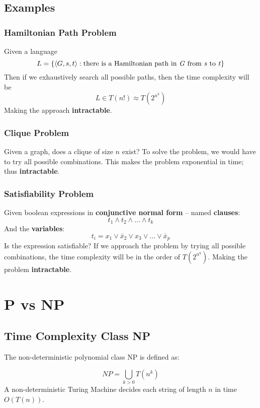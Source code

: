 \documentclass{article}
\begin{document}
\subsection{Examples}
\subsubsection{Hamiltonian Path Problem}
Given a language
\[ L = \{ \langle G, s, t \rangle : \text{there is a Hamiltonian path in \textit{G} from \textit{s} to \textit{t}} \}\]
Then if we exhaustively search all possible paths, then the time complexity will be
\[ L \in T(n!) \approx T(2^{n^k}) \]
Making the approach \textbf{intractable}.

\subsubsection{Clique Problem}
Given a graph, does a clique of size $n$ exist? To solve the problem, we would have to try all possible combinations. This makes the problem exponential in time; thus \textbf{intractable}.

\subsubsection{Satisfiability Problem}
Given boolean expressions in \textbf{conjunctive normal form} -- named \textbf{clauses}:
\[ t_1 \wedge t_2 \wedge \dots \wedge t_k \]
And the \textbf{variables}:
\[ t_i = x_1 \vee \bar x_2 \vee x_3 \vee \dots \vee \bar x_p \]
Is the expression satisfiable? If we approach the problem by trying all possible combinations, the time complexity will be in the order of $T(2^{n^k})$. Making the problem \textbf{intractable}.

\section{P vs NP}
\subsection{Time Complexity Class NP}
The non-deterministic polynomial class NP is defined as:

\[ NP = \bigcup_{k > 0}T(n^k) \]
A non-deterministic Turing Machine decides each string of length $n$ in time $O(T(n))$.
\end{document}
